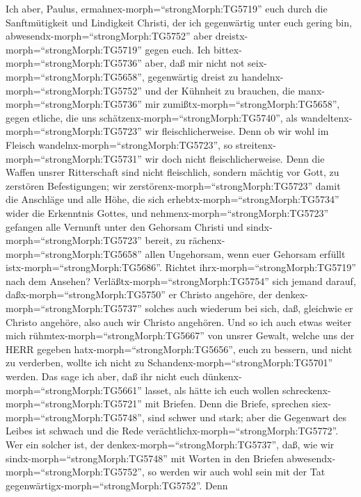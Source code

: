  Ich aber, Paulus, ermahnex-morph=``strongMorph:TG5719''
euch durch die Sanftmütigkeit und Lindigkeit Christi, der ich
gegenwärtig unter euch gering bin,
abwesendx-morph=``strongMorph:TG5752'' aber
dreistx-morph=``strongMorph:TG5719'' gegen euch.  Ich
bittex-morph=``strongMorph:TG5736'' aber, daß mir nicht not
seix-morph=``strongMorph:TG5658'', gegenwärtig dreist zu
handelnx-morph=``strongMorph:TG5752'' und der Kühnheit zu brauchen, die
manx-morph=``strongMorph:TG5736'' mir
zumißtx-morph=``strongMorph:TG5658'', gegen etliche, die uns
schätzenx-morph=``strongMorph:TG5740'', als
wandeltenx-morph=``strongMorph:TG5723'' wir fleischlicherweise.
 Denn ob wir wohl im Fleisch
wandelnx-morph=``strongMorph:TG5723'', so
streitenx-morph=``strongMorph:TG5731'' wir doch nicht
fleischlicherweise.  Denn die Waffen unsrer Ritterschaft
sind nicht fleischlich, sondern mächtig vor Gott, zu zerstören
Befestigungen;  wir zerstörenx-morph=``strongMorph:TG5723''
damit die Anschläge und alle Höhe, die sich
erhebtx-morph=``strongMorph:TG5734'' wider die Erkenntnis Gottes, und
nehmenx-morph=``strongMorph:TG5723'' gefangen alle Vernunft unter den
Gehorsam Christi  und sindx-morph=``strongMorph:TG5723''
bereit, zu rächenx-morph=``strongMorph:TG5658'' allen Ungehorsam, wenn
euer Gehorsam erfüllt istx-morph=``strongMorph:TG5686''. 
Richtet ihrx-morph=``strongMorph:TG5719'' nach dem Ansehen?
Verläßtx-morph=``strongMorph:TG5754'' sich jemand darauf,
daßx-morph=``strongMorph:TG5750'' er Christo angehöre, der
denkex-morph=``strongMorph:TG5737'' solches auch wiederum bei sich, daß,
gleichwie er Christo angehöre, also auch wir Christo angehören.
 Und so ich auch etwas weiter mich
rühmtex-morph=``strongMorph:TG5667'' von unsrer Gewalt, welche uns der
HERR gegeben hatx-morph=``strongMorph:TG5656'', euch zu bessern, und
nicht zu verderben, wollte ich nicht zu
Schandenx-morph=``strongMorph:TG5701'' werden.  Das sage ich
aber, daß ihr nicht euch dünkenx-morph=``strongMorph:TG5661'' lasset,
als hätte ich euch wollen schreckenx-morph=``strongMorph:TG5721'' mit
Briefen.  Denn die Briefe, sprechen
siex-morph=``strongMorph:TG5748'', sind schwer und stark; aber die
Gegenwart des Leibes ist schwach und die Rede
verächtlichx-morph=``strongMorph:TG5772''.  Wer ein solcher
ist, der denkex-morph=``strongMorph:TG5737'', daß, wie wir
sindx-morph=``strongMorph:TG5748'' mit Worten in den Briefen
abwesendx-morph=``strongMorph:TG5752'', so werden wir auch wohl sein mit
der Tat gegenwärtigx-morph=``strongMorph:TG5752''.  Denn
